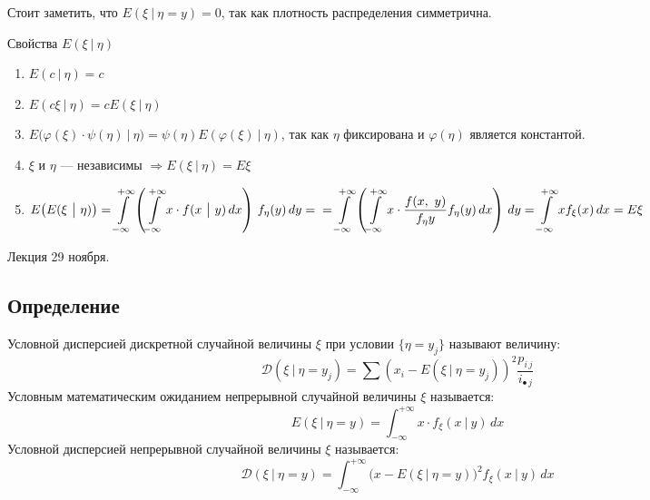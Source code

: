 \documentclass[12pt, a4paper]{article}
\begin{document}
    Стоит заметить, что $E(\xi\ \big|\ \eta = y) = 0$, так как плотность распределения симметрична.
    \begin{center}
        Свойства $E(\xi\ \big|\ \eta)$
    \end{center}
    \begin{enumerate}
        \item $E(c\ \big|\ \eta) = c$
        \item $E(c\xi\ \big|\ \eta) = cE(\xi\ \big|\ \eta)$
        \item $E\big(\varphi(\xi)\cdot \psi(\eta)\ \big|\ \eta\big) = \psi(\eta)E(\varphi(\xi)\ \big|\ \eta)$, так как $\eta$ фиксирована и $\varphi(\eta)$ является константой.
        \item $\xi$ и $\eta$ --- независимы $\Rightarrow E(\xi\ \big|\ \eta) = E\xi$
        \item $\displaystyle E\big(E(\xi\ \big|\ \eta)\big) = \int\limits_{-\infty}^{+\infty}\left(\int\limits_{-\infty}^{+\infty} x\cdot f(x\ \big|\ y)\, dx\right)\, f_{\eta}(y)\, dy =\\
        =  \int\limits_{-\infty}^{+\infty}\left(\int\limits_{-\infty}^{+\infty} x\cdot \frac{f(x,\ y)}{f_{\eta}{y}} f_{\eta}(y)\, dx\right)\, dy = \int\limits_{-\infty}^{+\infty} x f_{\xi}(x)\, dx = E\xi$ 
    \end{enumerate}
    \begin{center}
        Лекция 29 ноября.
    \end{center}
    \subsection*{Определение}
    Условной дисперсией дискретной случайной величины $\xi$ при условии $\{\eta = y_j\}$ называют величину:
    \[\mathcal{D}(\xi\ |\ \eta = y_j) = \sum \left(x_i - E(\xi\ |\ \eta = y_j)\right)^2 \frac{p_{i\, j}}{i_{\bullet\, j}}\]
    Условным математическим ожиданием непрерывной случайной величины $\xi$ называется:
    \[E(\xi\ |\ \eta = y) = \int_{-\infty}^{+\infty} x\cdot f_{\xi}(x\ |\ y)\, dx\]
    Условной дисперсией непрерывной случайной величины $\xi$ называется:
    \[\mathcal{D}(\xi\ |\ \eta = y) = \int_{-\infty}^{+\infty} \big(x - E(\xi\ |\ \eta = y)\big)^2 f_{\xi}(x\ |\ y)\, dx\]
\end{document}
